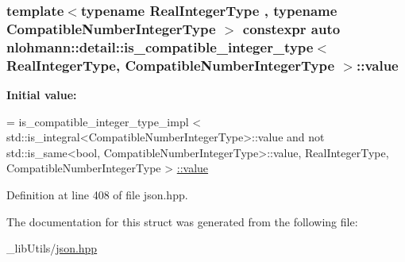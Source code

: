 \subsubsection[{\texorpdfstring{value}{value}}]{\setlength{\rightskip}{0pt plus 5cm}template$<$typename Real\+Integer\+Type , typename Compatible\+Number\+Integer\+Type $>$ constexpr auto {\bf nlohmann\+::detail\+::is\+\_\+compatible\+\_\+integer\+\_\+type}$<$ Real\+Integer\+Type, Compatible\+Number\+Integer\+Type $>$\+::value\hspace{0.3cm}{\ttfamily [static]}}\hypertarget{structnlohmann_1_1detail_1_1is__compatible__integer__type_ac5e5bd39773676564c73d3dd2a9c6e0a}{}\label{structnlohmann_1_1detail_1_1is__compatible__integer__type_ac5e5bd39773676564c73d3dd2a9c6e0a}
{\bfseries Initial value\+:}
\begin{DoxyCode}
=
        is\_compatible\_integer\_type\_impl <
        std::is\_integral<CompatibleNumberIntegerType>::value and
        not std::is\_same<bool, CompatibleNumberIntegerType>::value,
        RealIntegerType, CompatibleNumberIntegerType > \hyperlink{structnlohmann_1_1detail_1_1is__compatible__integer__type_ac5e5bd39773676564c73d3dd2a9c6e0a}{::value}
\end{DoxyCode}


Definition at line 408 of file json.\+hpp.



The documentation for this struct was generated from the following file\+:\begin{DoxyCompactItemize}
\item 
\+\_\+lib\+Utils/\hyperlink{json_8hpp}{json.\+hpp}\end{DoxyCompactItemize}
